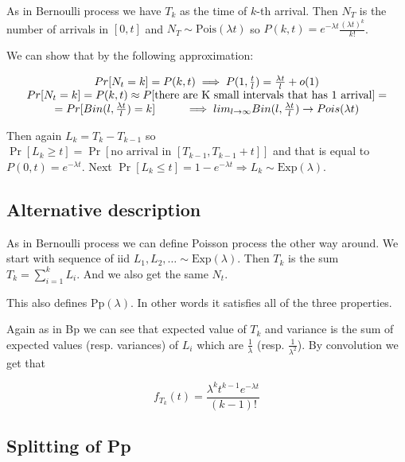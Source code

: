 
As in Bernoulli process we have $T_{k}$ as the time of $k$-th arrival. Then $N_{T}$ is the number of arrivals in $[0,t]$ and $N_{T} \sim \text{Pois}(\lambda t)$ so $P(k, t) = e^{-\lambda t} \frac{(\lambda t)^{k}}{k!}$.

We can show that by the following approximation:

$$
\begin{array}{c}
	Pr[N_t = k] = P(k,t) \implies P(1, \frac{t}{l}) = \frac{\lambda t}{l} + o(1) \\
	Pr[N_t = k] = P(k, t) \approx P[\text{there are K small intervals that has 1 arrival}] = \\
	= Pr[Bin(l, \frac{\lambda t}{l}) = k] \newline \implies lim_{l \to \infty} Bin(l, \frac{\lambda t}{l}) \to Pois(\lambda  t)
\end{array}
$$

Then again $L_{k} = T_{k} - T_{k-1}$ so $\Pr[L_{k} \geq t] = \Pr[\text{no arrival in }[T_{k-1}, T_{k-1}+t]]$ and that is equal to $P(0,t) = e^{-\lambda t}$. Next $\Pr[L_{k} \leq t] = 1 - e^{-\lambda t} \Rightarrow L_{k} \sim \text{Exp}(\lambda)$.

\subsection{Alternative description}

As in Bernoulli process we can define Poisson process the other way around. We start with sequence of iid $L_{1}, L_{2}, \dots \sim \text{Exp}(\lambda)$. Then $T_{k}$ is the sum $T_{k} = \sum_{i=1}^{k} L_{i}$. And we also get the same $N_{t}$.

\begin{thm}
	This also defines $\text{Pp}(\lambda)$. In other words it satisfies all of the three properties.
\end{thm}

Again as in Bp we can see that expected value of $T_{k}$ and variance is the sum of expected values (resp. variances) of $L_{i}$ which are $\frac{1}{\lambda}$ (resp. $\frac{1}{\lambda^{2}}$). By convolution we get that

$$
f_{T_{k}} (t) = \frac{\lambda^{k} t^{k-1}e^{-\lambda t}}{(k-1)!}
$$

\subsection{Splitting of Pp}

